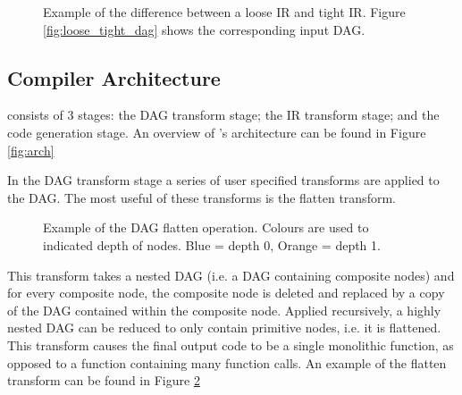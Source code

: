 \begin{figure}
\centering


\usebox{\measurebox}\qquad
    \begin{minipage}[][\ht\measurebox][c]{.26\textwidth}
       
    \end{minipage}
\caption{Example of the difference between a loose IR and tight IR. Figure \ref{fig:loose_tight_dag} shows the corresponding input DAG.}
\label{fig:tight_loose}
\end{figure}


\subsection{Compiler Architecture}
\phlat consists of 3 stages: the DAG transform stage; the IR transform stage; and the code generation stage.
An overview of \phlat{}'s architecture can be found in Figure \ref{fig:arch}



In the DAG transform stage a series of user specified transforms are applied to the DAG.
The most useful of these transforms is the flatten transform.

\begin{figure}[h!]
    \centering
    \hspace{1em}
    \hspace{1em}
    \caption{Example of the DAG flatten operation. Colours are used to indicated depth of nodes. Blue = depth 0, Orange = depth 1.}\label{fig:flatten_example}
\end{figure}

This transform takes a nested DAG (i.e. a DAG containing composite nodes) and for every composite node, the composite node is deleted and replaced by a copy of the DAG contained within the composite node.
Applied recursively, a highly nested DAG can be reduced to only contain primitive nodes, i.e. it is flattened.
This transform causes the final output code to be a single monolithic function, as opposed to a function containing many function calls.
An example of the flatten transform can be found in Figure \ref{fig:flatten_example}

